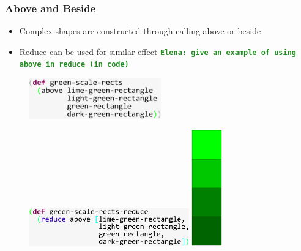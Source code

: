 \documentclass{beamer}
\newcommand{\comment}[1]{{\bf \tt  {#1}}}
\newcommand{\emcomment}[1]{\textcolor{ForestGreen}{\comment{Elena: {#1}}}}
\begin{document}
\begin{frame}
\frametitle{Above and Beside}
	\begin{itemize}
		\item Complex shapes are constructed through calling above or beside
		\item Reduce can be used for similar effect \emcomment{give an example of using {\tt above} in {\tt reduce} (in code)}
	\end{itemize}

	\begin{figure}
	\hspace{-4.3cm}
	\vspace{0.8cm}
		\includegraphics[width=5.7cm]{PresentationImages/greenScaleRects.pdf}
	\end{figure}
	\begin{figure}
	\vspace{-4.8cm}
		\includegraphics[width=6.9cm]{PresentationImages/greenScaleRectsReduce.pdf}
		\hspace{1.6cm}
		\includegraphics[width=1.3cm]{PresentationImages/greenScaleTower.pdf}
	\end{figure}

\end{frame}
\end{document}
